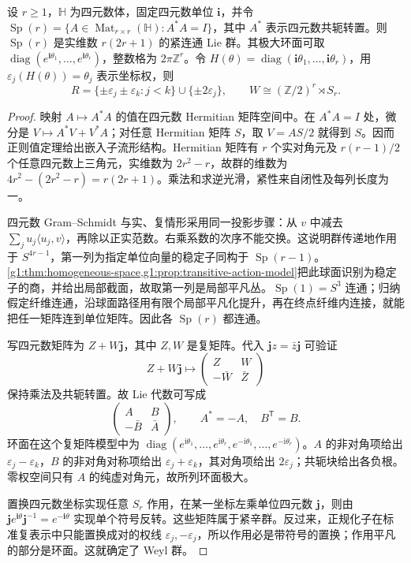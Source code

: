 \begin{proposition}\label{g1:prop:symplectic-torus-roots}
	设 \(r\ge1\)，\(\mathbb H\) 为四元数体，固定四元数单位 \(\mathbf i\)，并令 \(\operatorname{Sp}(r)=\{A\in\operatorname{Mat}_{r\times r}(\mathbb H):A^*A=I\}\)，其中 \(A^*\) 表示四元数共轭转置。则 \(\operatorname{Sp}(r)\) 是实维数 \(r(2r+1)\) 的紧连通 Lie 群。其极大环面可取 \(\operatorname{diag}(e^{\mathbf i\theta_1},\ldots,e^{\mathbf i\theta_r})\)，整数格为 \(2\pi\mathbb Z^r\)。令 \(H(\theta)=\operatorname{diag}(\mathbf i\theta_1,\ldots,\mathbf i\theta_r)\)，用 \(\varepsilon_j(H(\theta))=\theta_j\) 表示坐标权，则
	\[
		R=\{\pm\varepsilon_j\pm\varepsilon_k:j<k\}\cup\{\pm2\varepsilon_j\},\qquad
		W\cong(\mathbb Z/2)^r\rtimes S_r.
	\]
\end{proposition}
\begin{proof}
	映射 \(A\mapsto A^*A\) 的值在四元数 Hermitian 矩阵空间中。在 \(A^*A=I\) 处，微分是 \(V\mapsto A^*V+V^*A\)；对任意 Hermitian 矩阵 \(S\)，取 \(V=AS/2\) 就得到 \(S\)。因而正则值定理给出嵌入子流形结构。Hermitian 矩阵有 \(r\) 个实对角元及 \(r(r-1)/2\) 个任意四元数上三角元，实维数为 \(2r^2-r\)，故群的维数为 \(4r^2-(2r^2-r)=r(2r+1)\)。乘法和求逆光滑，紧性来自闭性及每列长度为一。

	四元数 Gram--Schmidt 与实、复情形采用同一投影步骤：从 \(v\) 中减去 \(\sum_j u_j\langle u_j,v\rangle\)，再除以正实范数。右乘系数的次序不能交换。这说明群传递地作用于 \(S^{4r-1}\)，第一列为指定单位向量的稳定子同构于 \(\operatorname{Sp}(r-1)\)。\cref{g1:thm:homogeneous-space,g1:prop:transitive-action-model}把此球面识别为稳定子的商，并给出局部截面，故取第一列是局部平凡丛。\(\operatorname{Sp}(1)=S^3\) 连通；归纳假定纤维连通，沿球面路径用有限个局部平凡化提升，再在终点纤维内连接，就能把任一矩阵连到单位矩阵。因此各 \(\operatorname{Sp}(r)\) 都连通。

	写四元数矩阵为 \(Z+W\mathbf j\)，其中 \(Z,W\) 是复矩阵。代入 \(\mathbf jz=\bar z\mathbf j\) 可验证
	\[
		Z+W\mathbf j\longmapsto
		\begin{pmatrix}Z&W\\-\bar W&\bar Z\end{pmatrix}
	\]
	保持乘法及共轭转置。故 Lie 代数可写成
	\[
		\begin{pmatrix}A&B\\-\bar B&\bar A\end{pmatrix},\qquad A^*=-A,\quad B^{\mathsf T}=B.
	\]
	环面在这个复矩阵模型中为 \(\operatorname{diag}(e^{\mathrm{i}\theta_1},\ldots,e^{\mathrm{i}\theta_r},e^{-\mathrm{i}\theta_1},\ldots,e^{-\mathrm{i}\theta_r})\)。\(A\) 的非对角项给出 \(\varepsilon_j-\varepsilon_k\)，\(B\) 的非对角对称项给出 \(\varepsilon_j+\varepsilon_k\)，其对角项给出 \(2\varepsilon_j\)；共轭块给出各负根。零权空间只有 \(A\) 的纯虚对角元，故所列环面极大。

	置换四元数坐标实现任意 \(S_r\) 作用，在某一坐标左乘单位四元数 \(\mathbf j\)，则由 \(\mathbf j e^{\mathbf i\theta}\mathbf j^{-1}=e^{-\mathbf i\theta}\) 实现单个符号反转。这些矩阵属于紧辛群。反过来，正规化子在标准复表示中只能置换成对的权线 \(\varepsilon_j,-\varepsilon_j\)，所以作用必是带符号的置换；作用平凡的部分是环面。这就确定了 Weyl 群。
\end{proof}

